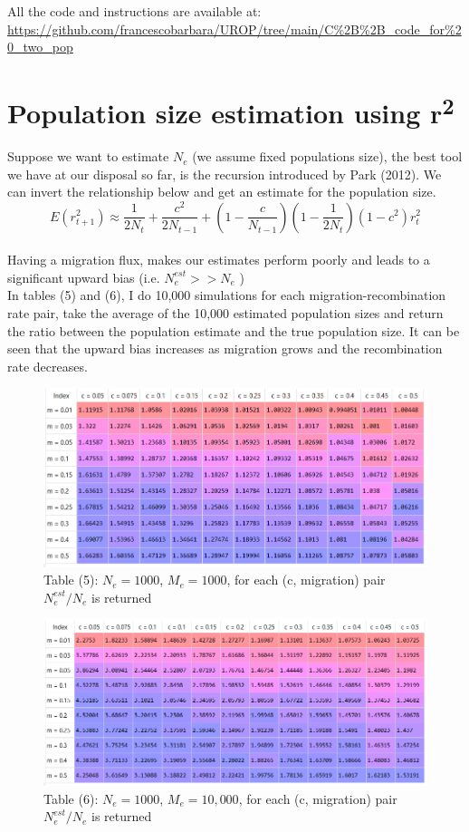 \documentclass[a4paper,12pt]{article}
\begin{document}
All the code and instructions are available at:\\
\url{https://github.com/francescobarbara/UROP/tree/main/C%2B%2B_code_for%20_two_pop}

\section{Population size estimation using  r\textsuperscript{2}}
Suppose we want to estimate $N_e$ (we assume fixed populations size), the best tool we have at our disposal so far, is the recursion introduced by Park (2012). We can invert the relationship below and get an estimate for the population size.
$$ E(r^2_{t+1}) \approx \frac{1}{2N_t} + \frac{c^2}{2N_{t-1}} + (1 - \frac{c}{N_{t-1}})(1 -  \frac{1}{2N_t}) (1- c^2) r^2_{t} $$ \\
Having a migration flux, makes our estimates perform poorly and leads to a significant upward bias (i.e. $N_{e}^{est}  >> N_e $ )\\
In tables (5) and (6), I do 10,000 simulations for each migration-recombination rate pair, take the average of the 10,000 estimated population sizes and return the ratio between the population estimate and the true population size.
It can be seen that the upward bias increases as migration grows and the recombination rate decreases.

\begin{figure}[H]
    
    \includegraphics[scale=0.9]{5.png}%
    \caption*{Table (5): $N_e = 1000$, $M_e = 1000$, for each (c, migration) pair $N_{e}^{est} / N_e $  is returned}%
\end{figure}%

\begin{figure}[H]
    
    \includegraphics[scale=0.85]{6.png}%
    \caption*{Table (6): $N_e = 1000$, $M_e = 10,000$, for each (c, migration) pair $N_{e}^{est} / N_e $ is returned}%
\end{figure}%
\end{document}
